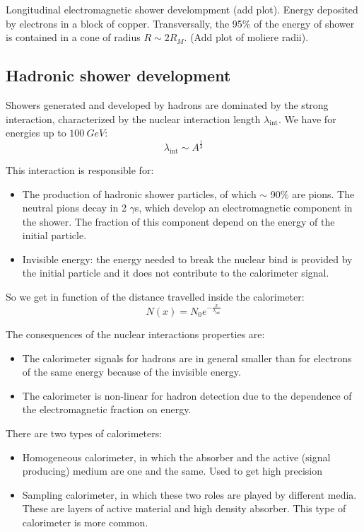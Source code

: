 \documentclass[../../main/main.tex]{subfiles}
\begin{document}
Longitudinal electromagnetic shower develompment (add plot). Energy deposited by electrons in a block of copper. Transversally, the 95\% of the energy of shower is contained in a cone of radius \( R \sim 2R_M \). (Add plot of moliere radii).





\subsection{Hadronic shower development}
Showers generated and developed by hadrons are dominated by the strong interaction, characterized by the nuclear interaction length \( \lambda_\mathrm{int} \). We have for energies up to \( 100 \ \si{GeV} \):
\begin{equation}
	\lambda_\mathrm{int}
	\sim
	A^{\frac{1}{3}}
	\label{eq:}
\end{equation}

This interaction is responsible for:
\begin{itemize}
	\item The production of hadronic shower particles, of which \( \sim \) 90\% are pions. The neutral pions decay in 2 \( \gamma \)s, which develop an electromagnetic component in the shower. The fraction of this component depend on the energy of the initial particle.
	\item Invisible energy: the energy needed to break the nuclear bind is provided by the initial particle and it does not contribute to the calorimeter signal.
\end{itemize}
So we get in function of the distance travelled inside the calorimeter:
\begin{equation}
	N(x)
	=
	N_0 e^{-\frac{x}{\lambda_\mathrm{int}}}
	\label{eq:}
\end{equation}


The consequences of the nuclear interactions properties are:
\begin{itemize}
	\item The calorimeter signals for hadrons are in general smaller than for electrons of the same energy because of the invisible energy.
	\item The calorimeter is non-linear for hadron detection due to the dependence of the electromagnetic fraction on energy.
\end{itemize}

There are two types of calorimeters:
\begin{itemize}
	\item Homogeneous calorimeter, in which the absorber and the active (signal producing) medium are one and the same. Used to get high precision
	\item Sampling calorimeter, in which these two roles are played by different media. These are layers of active material and high density absorber. This type of calorimeter is more common.
\end{itemize}
\end{document}

